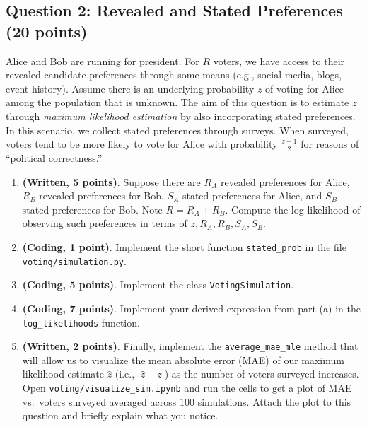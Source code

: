 \documentclass[
  letterpaper,
  numbers=noenddot,
  DIV=11,
  oneside]{scrreprt}
\theoremstyle{remark}
\begin{document}
\subsection*{Question 2: Revealed and Stated Preferences (20
points)}\label{question-2-revealed-and-stated-preferences-20-points}

Alice and Bob are running for president. For \(R\) voters, we have
access to their revealed candidate preferences through some means (e.g.,
social media, blogs, event history). Assume there is an underlying
probability \(z\) of voting for Alice among the population that is
unknown. The aim of this question is to estimate \(z\) through
\emph{maximum likelihood estimation} by also incorporating stated
preferences. In this scenario, we collect stated preferences through
surveys. When surveyed, voters tend to be more likely to vote for Alice
with probability \(\frac{z+1}{2}\) for reasons of ``political
correctness.''

\begin{enumerate}
\def\labelenumi{(\alph{enumi})}
\item
  \textbf{(Written, 5 points)}. Suppose there are \(R_A\) revealed
  preferences for Alice, \(R_B\) revealed preferences for Bob, \(S_A\)
  stated preferences for Alice, and \(S_B\) stated preferences for Bob.
  Note \(R=R_A+R_B\). Compute the log-likelihood of observing such
  preferences in terms of \(z, R_A, R_B, S_A, S_B\).
\item
  \textbf{(Coding, 1 point)}. Implement the short function
  \texttt{stated\_prob} in the file \texttt{voting/simulation.py}.
\item
  \textbf{(Coding, 5 points)}. Implement the class
  \texttt{VotingSimulation}.
\item
  \textbf{(Coding, 7 points)}. Implement your derived expression from
  part (a) in the \texttt{log\_likelihoods} function.
\item
  \textbf{(Written, 2 points)}. Finally, implement the
  \texttt{average\_mae\_mle} method that will allow us to visualize the
  mean absolute error (MAE) of our maximum likelihood estimate
  \(\hat{z}\) (i.e., \(|\hat{z}-z|\)) as the number of voters surveyed
  increases. Open \texttt{voting/visualize\_sim.ipynb} and run the cells
  to get a plot of MAE vs.~voters surveyed averaged across \(100\)
  simulations. Attach the plot to this question and briefly explain what
  you notice.
\end{enumerate}
\end{document}
